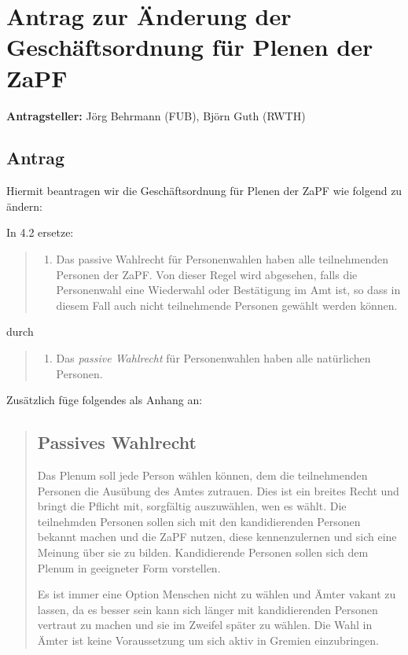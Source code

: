 \documentclass[draft,10pt,oneside]{scrartcl}
\begin{document}
\section*{Antrag zur Änderung der Geschäftsordnung für Plenen der ZaPF}

\textbf{Antragsteller:} Jörg Behrmann (FUB), Björn Guth (RWTH)

\subsection*{Antrag}

Hiermit beantragen wir die Geschäftsordnung für Plenen der ZaPF wie folgend zu
ändern:

In 4.2 ersetze:
\begin{quote}
    \begin{enumerate}
        \item Das passive Wahlrecht für Personenwahlen haben alle teilnehmenden
            Personen der ZaPF. Von dieser Regel wird abgesehen, falls die
            Personenwahl eine Wiederwahl oder Bestätigung im Amt ist, so dass
            in diesem Fall auch nicht teilnehmende Personen gewählt werden
            können.
    \end{enumerate}
\end{quote}
durch
\begin{quote}
    \begin{enumerate}
        \item Das \textit{passive Wahlrecht} für Personenwahlen haben alle
            natürlichen Personen.
    \end{enumerate}
\end{quote}
Zusätzlich füge folgendes als Anhang an:
\begin{quote}
    \subsection*{Passives Wahlrecht}

    Das Plenum soll jede Person wählen können, dem die teilnehmenden Personen die
    Ausübung des Amtes zutrauen. Dies ist ein breites Recht und bringt die Pflicht
    mit, sorgfältig auszuwählen, wen es wählt. Die teilnehmden Personen sollen sich
    mit den kandidierenden Personen bekannt machen und die ZaPF nutzen, diese
    kennenzulernen und sich eine Meinung über sie zu bilden. Kandidierende Personen
    sollen sich dem Plenum in geeigneter Form vorstellen.

    Es ist immer eine Option Menschen nicht zu wählen und Ämter vakant zu lassen, da
    es besser sein kann sich länger mit kandidierenden Personen vertraut zu machen
    und sie im Zweifel später zu wählen. Die Wahl in Ämter ist keine Voraussetzung
    um sich aktiv in Gremien einzubringen.
\end{quote}
\end{document}
